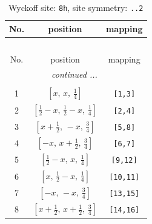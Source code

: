 \documentclass[fleqn,8pt]{jsarticle}
\begin{document}
\begin{longtable}{ccc}
\caption{Wyckoff site: {\tt 8h}, site symmetry: {\tt ..2}}
 \\
 \hline \hline
No. & position & mapping \\ \hline \endfirsthead

\multicolumn{2}{l}{\tablename\ \thetable{}} \\
 \hline \hline
No. & position & mapping \\ \hline \endhead

 \hline \hline
\multicolumn{2}{r}{\footnotesize\it continued ...} \\ \endfoot

 \hline \hline
\multicolumn{2}{r}{} \\ \endlastfoot

1 & $\left[ x,\, x,\, \frac{1}{4} \right]$ & {\tt [1,3]} \\ \hline
2 & $\left[ \frac{1}{2} - x,\, \frac{1}{2} - x,\, \frac{1}{4} \right]$ & {\tt [2,4]} \\ \hline
3 & $\left[ x + \frac{1}{2},\, - x,\, \frac{3}{4} \right]$ & {\tt [5,8]} \\ \hline
4 & $\left[ - x,\, x + \frac{1}{2},\, \frac{3}{4} \right]$ & {\tt [6,7]} \\ \hline
5 & $\left[ \frac{1}{2} - x,\, x,\, \frac{1}{4} \right]$ & {\tt [9,12]} \\ \hline
6 & $\left[ x,\, \frac{1}{2} - x,\, \frac{1}{4} \right]$ & {\tt [10,11]} \\ \hline
7 & $\left[ - x,\, - x,\, \frac{3}{4} \right]$ & {\tt [13,15]} \\ \hline
8 & $\left[ x + \frac{1}{2},\, x + \frac{1}{2},\, \frac{3}{4} \right]$ & {\tt [14,16]} \\
\end{longtable}
\renewcommand{\arraystretch}{1.2}
\end{document}

